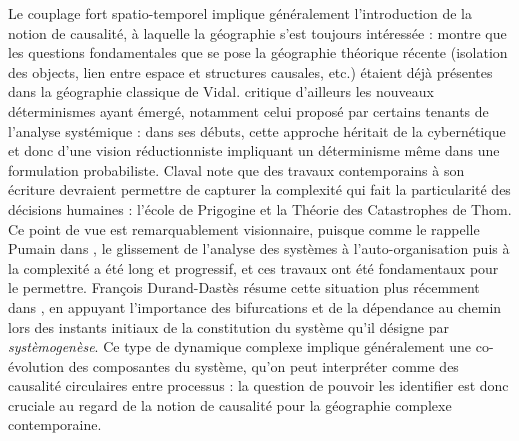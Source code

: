 \documentclass[french]{./sageo}
\begin{document}
Le couplage fort spatio-temporel implique généralement l'introduction de la notion de causalité, à laquelle la géographie s'est toujours intéressée : \cite{loi1985etude} montre que les questions fondamentales que se pose la géographie théorique récente (isolation des objects, lien entre espace et structures causales, etc.) étaient déjà présentes dans la géographie classique de Vidal. \cite{claval1985causalite} critique d'ailleurs les nouveaux déterminismes ayant émergé, notamment celui proposé par certains tenants de l'analyse systémique : dans ses débuts, cette approche héritait de la cybernétique et donc d'une vision réductionniste impliquant un déterminisme même dans une formulation probabiliste. Claval note que des travaux contemporains à son écriture devraient permettre de capturer la complexité qui fait la particularité des décisions humaines : l'école de Prigogine et la Théorie des Catastrophes de Thom. Ce point de vue est remarquablement visionnaire, puisque comme le rappelle Pumain dans \cite{pumain2003approche}, le glissement de l'analyse des systèmes à l'auto-organisation puis à la complexité a été long et progressif, et ces travaux ont été fondamentaux pour le permettre. François Durand-Dastès résume cette situation plus récemment dans \cite{durand2003geographes}, en appuyant l'importance des bifurcations et de la dépendance au chemin lors des instants initiaux de la constitution du système qu'il désigne par \emph{systèmogenèse}. Ce type de dynamique complexe implique généralement une co-évolution des composantes du système, qu'on peut interpréter comme des causalité circulaires entre processus : la question de pouvoir les identifier est donc cruciale au regard de la notion de causalité pour la géographie complexe contemporaine.
\end{document}
